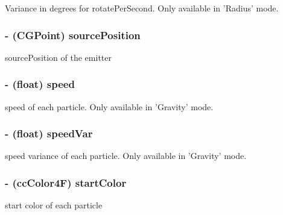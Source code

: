 Variance in degrees for rotate\-Per\-Second. Only available in 'Radius' mode. \hypertarget{interface_c_c_particle_system_a68e4c7c8937306ce0290d16ff138ba5a}{
\subsubsection[{source\-Position}]{\setlength{\rightskip}{0pt plus 5cm}-\/ (C\-G\-Point) {\bf source\-Position}}}\label{interface_c_c_particle_system_a68e4c7c8937306ce0290d16ff138ba5a}
source\-Position of the emitter \hypertarget{interface_c_c_particle_system_a3ca34d808d087673edfddffa81bb0b94}{
\subsubsection[{speed}]{\setlength{\rightskip}{0pt plus 5cm}-\/ (float) {\bf speed}}}\label{interface_c_c_particle_system_a3ca34d808d087673edfddffa81bb0b94}
speed of each particle. Only available in 'Gravity' mode. \hypertarget{interface_c_c_particle_system_a8425df9477c9448d70c26b85c671ded3}{
\subsubsection[{speed\-Var}]{\setlength{\rightskip}{0pt plus 5cm}-\/ (float) {\bf speed\-Var}}}\label{interface_c_c_particle_system_a8425df9477c9448d70c26b85c671ded3}
speed variance of each particle. Only available in 'Gravity' mode. \hypertarget{interface_c_c_particle_system_aeb2e14c2f0c26b93d1cfb55f97b94266}{
\subsubsection[{start\-Color}]{\setlength{\rightskip}{0pt plus 5cm}-\/ ({\bf cc\-Color4\-F}) {\bf start\-Color}}}\label{interface_c_c_particle_system_aeb2e14c2f0c26b93d1cfb55f97b94266}
start color of each particle 

